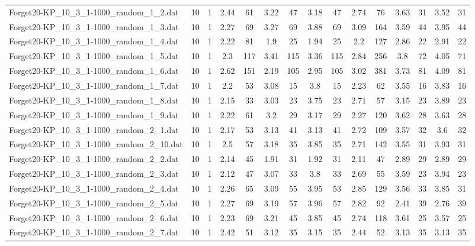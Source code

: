 \begin{table}[!ht]
{\begin{tabular}{lcccccccccccccc}
Forget20-KP\_10\_3\_1-1000\_random\_1\_2.dat & 10 & 1 & 2.44 & 61 & 3.22 & 47 & 3.18 & 47 & 2.74 & 76 & 3.63 & 31 & 3.52 & 31 \\
Forget20-KP\_10\_3\_1-1000\_random\_1\_3.dat & 10 & 1 & 2.27 & 69 & 3.27 & 69 & 3.88 & 69 & 3.09 & 164 & 3.59 & 44 & 3.95 & 44 \\
Forget20-KP\_10\_3\_1-1000\_random\_1\_4.dat & 10 & 1 & 2.22 & 81 & 1.9 & 25 & 1.94 & 25 & 2.2 & 127 & 2.86 & 22 & 2.91 & 22 \\
Forget20-KP\_10\_3\_1-1000\_random\_1\_5.dat & 10 & 1 & 2.3 & 117 & 3.41 & 115 & 3.36 & 115 & 2.84 & 256 & 3.8 & 72 & 4.05 & 71 \\
Forget20-KP\_10\_3\_1-1000\_random\_1\_6.dat & 10 & 1 & 2.62 & 151 & 2.19 & 105 & 2.95 & 105 & 3.02 & 381 & 3.73 & 81 & 4.09 & 81 \\
Forget20-KP\_10\_3\_1-1000\_random\_1\_7.dat & 10 & 1 & 2.2 & 53 & 3.08 & 15 & 3.8 & 15 & 2.23 & 62 & 3.55 & 16 & 3.83 & 16 \\
Forget20-KP\_10\_3\_1-1000\_random\_1\_8.dat & 10 & 1 & 2.15 & 33 & 3.03 & 23 & 3.75 & 23 & 2.71 & 57 & 3.15 & 23 & 3.89 & 23 \\
Forget20-KP\_10\_3\_1-1000\_random\_1\_9.dat & 10 & 1 & 2.22 & 61 & 3.2 & 29 & 3.17 & 29 & 2.27 & 120 & 3.62 & 28 & 3.63 & 28 \\
Forget20-KP\_10\_3\_1-1000\_random\_2\_1.dat & 10 & 1 & 2.17 & 53 & 3.13 & 41 & 3.13 & 41 & 2.72 & 109 & 3.57 & 32 & 3.6 & 32 \\
Forget20-KP\_10\_3\_1-1000\_random\_2\_10.dat & 10 & 1 & 2.5 & 57 & 3.18 & 35 & 3.85 & 35 & 2.71 & 142 & 3.55 & 31 & 3.93 & 31 \\
Forget20-KP\_10\_3\_1-1000\_random\_2\_2.dat & 10 & 1 & 2.14 & 45 & 1.91 & 31 & 1.92 & 31 & 2.11 & 47 & 2.89 & 29 & 2.89 & 29 \\
Forget20-KP\_10\_3\_1-1000\_random\_2\_3.dat & 10 & 1 & 2.12 & 47 & 3.07 & 33 & 3.8 & 33 & 2.69 & 55 & 3.59 & 23 & 3.94 & 23 \\
Forget20-KP\_10\_3\_1-1000\_random\_2\_4.dat & 10 & 1 & 2.26 & 65 & 3.09 & 55 & 3.95 & 53 & 2.85 & 129 & 3.56 & 33 & 3.85 & 31 \\
Forget20-KP\_10\_3\_1-1000\_random\_2\_5.dat & 10 & 1 & 2.27 & 69 & 3.19 & 57 & 3.96 & 57 & 2.82 & 92 & 2.41 & 39 & 2.76 & 39 \\
Forget20-KP\_10\_3\_1-1000\_random\_2\_6.dat & 10 & 1 & 2.23 & 69 & 3.21 & 45 & 3.85 & 45 & 2.74 & 118 & 3.61 & 25 & 3.57 & 25 \\
Forget20-KP\_10\_3\_1-1000\_random\_2\_7.dat & 10 & 1 & 2.42 & 51 & 3.12 & 35 & 3.15 & 35 & 2.44 & 52 & 3.13 & 35 & 3.13 & 35 \\

\end{tabular}}
\end{table}
